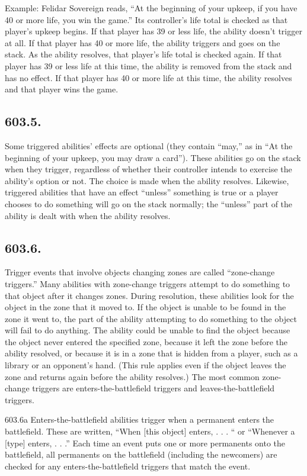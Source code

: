 Example: Felidar Sovereign reads, “At the beginning of your upkeep, if you have 40 or more life, you win the game.” Its controller’s life total is checked as that player’s upkeep begins. If that player has 39 or less life, the ability doesn’t trigger at all. If that player has 40 or more life, the ability triggers and goes on the stack. As the ability resolves, that player’s life total is checked again. If that player has 39 or less life at this time, the ability is removed from the stack and has no effect. If that player has 40 or more life at this time, the ability resolves and that player wins the game.

\subsection*{603.5.}
Some triggered abilities’ effects are optional (they contain “may,” as in “At the beginning of your upkeep, you may draw a card”). These abilities go on the stack when they trigger, regardless of whether their controller intends to exercise the ability’s option or not. The choice is made when the ability resolves. Likewise, triggered abilities that have an effect “unless” something is true or a player chooses to do something will go on the stack normally; the “unless” part of the ability is dealt with when the ability resolves.

\subsection*{603.6.}
Trigger events that involve objects changing zones are called “zone-change triggers.” Many abilities with zone-change triggers attempt to do something to that object after it changes zones. During resolution, these abilities look for the object in the zone that it moved to. If the object is unable to be found in the zone it went to, the part of the ability attempting to do something to the object will fail to do anything. The ability could be unable to find the object because the object never entered the specified zone, because it left the zone before the ability resolved, or because it is in a zone that is hidden from a player, such as a library or an opponent’s hand. (This rule applies even if the object leaves the zone and returns again before the ability resolves.) The most common zone-change triggers are enters-the-battlefield triggers and leaves-the-battlefield triggers.

603.6a Enters-the-battlefield abilities trigger when a permanent enters the battlefield. These are written, “When [this object] enters, . . . “ or “Whenever a [type] enters, . . .” Each time an event puts one or more permanents onto the battlefield, all permanents on the battlefield (including the newcomers) are checked for any enters-the-battlefield triggers that match the event.

